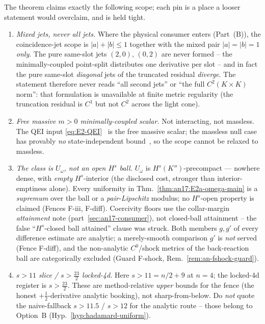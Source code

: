 \begin{remark}\label{rem:an17-scope-pins}
The theorem claims exactly the following scope; each pin is a place a
looser statement would overclaim, and is held tight.
\begin{enumerate}[label=\textup{(\arabic*)},leftmargin=*]
  \item \emph{Mixed jets, never all jets.}  Where the physical consumer
    enters (Part~(B)), the coincidence-jet scope is $|a|+|b|\le1$
    together with the mixed pair $|a|=|b|=1$ \emph{only}.  The pure
    same-slot jets $(2,0)$, $(0,2)$ are never formed -- the
    minimally-coupled point-split distributes one derivative per slot --
    and in fact the pure same-slot \emph{diagonal} jets of the truncated
    residual \emph{diverge}.  The statement therefore never reads ``all
    second jets'' or ``the full $C^2(K\times K)$ norm'': that
    formulation is unavailable at finite metric regularity (the
    truncation residual is $C^1$ but not $C^2$ across the light cone).
  \item \emph{Free massive $m>0$ minimally-coupled scalar.}  Not
    interacting, not massless.  The QEI input
    \eqref{eq:E2-QEI}~\cite{Sanders2024StressBounds} is the free massive
    scalar; the massless null case has provably \emph{no}
    state-independent bound~\cite{FewsterRoman2003}, so the scope cannot
    be relaxed to massless.
  \item \emph{The class is $U_\omega$, not an open $H^s$ ball.}
    $U_\omega$ is $H^s(K'')$-precompact --- nowhere dense, with
    \emph{empty} $H^s$-interior (the disclosed cost, stronger than
    interior-emptiness alone).  Every uniformity in
    Thm.~\ref{thm:an17:E2a-omega-main} is a \emph{supremum} over the ball
    or a \emph{pair-Lipschitz} modulus; no $H^s$-open property is claimed
    (Fences F-iii, F-diff).  Coercivity floors use the collar-margin
    \emph{attainment} note (part~\ref{sec:an17-consumer}), not
    closed-ball attainment -- the false ``$H^s$-closed ball attained''
    clause was struck.  Both members $g,g'$ of every
    difference estimate are analytic; a merely-smooth comparison $g'$ is
    \emph{not} served (Fence F-diff), and the non-analytic $C^0$/shock
    metrics of the back-reaction ball are categorically excluded (Guard
    F-shock, Rem.~\ref{rem:an-fshock-guard}).
  \item \emph{$s>11$ slice / $s>\tfrac{23}{2}$ locked-4d.}  Here
    $s>11=n/2+9$ at $n=4$; the locked-4d register is $s>\tfrac{23}{2}$.
    These are method-relative \emph{upper} bounds for the fence (the
    honest $+\tfrac12$-derivative analytic booking), not sharp-from-below.
    Do \emph{not} quote the naive-fallback $s>11.5$ / $s>12$ for the
    analytic route -- those belong to Option~B
    (Hyp.~\ref{hyp:hadamard-uniform}).
\end{enumerate}
\end{remark}

